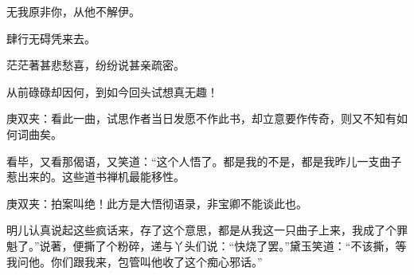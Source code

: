 \begin{poem}
    \begin{pl}无我原非你，从他不解伊。\end{pl}

    \begin{pl}肆行无碍凭来去。\end{pl}

    \begin{pl}茫茫著甚悲愁喜，纷纷说甚亲疏密。\end{pl}

    \begin{pl}从前碌碌却因何，到如今回头试想真无趣！\end{pl}
    \begin{note}庚双夹：看此一曲，试思作者当日发愿不作此书，却立意要作传奇，则又不知有如何词曲矣。\end{note}
\end{poem}


\begin{parag}
    看毕，又看那偈语，又笑道：“这个人悟了。都是我的不是，都是我昨儿一支曲子惹出来的。这些道书禅机最能移性。\begin{note}庚双夹：拍案叫绝！此方是大悟彻语录，非宝卿不能谈此也。\end{note}明儿认真说起这些疯话来，存了这个意思，都是从我这一只曲子上来，我成了个罪魁了。”说著，便撕了个粉碎，递与丫头们说：“快烧了罢。”黛玉笑道：“不该撕，等我问他。你们跟我来，包管叫他收了这个痴心邪话。”
\end{parag}


